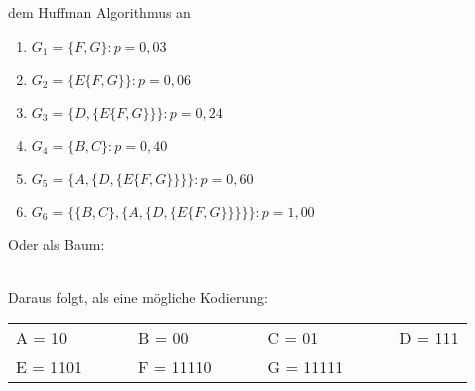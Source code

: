 \begin{questions}
\begin{parts}
\begin{subparts}
			\pagebreak
			\subpart dem Huffman Algorithmus an
			\begin{solutionordottedlines}[2cm]
				\begin{enumerate}
					\item $G_1 = \{F, G\}: p = 0{,}03$
					\item $G_2 = \{E\{F, G\}\}: p = 0{,}06$
					\item $G_3 = \{D,\{E\{F, G\}\}\}: p = 0{,}24$
					\item $G_4 = \{B, C\}: p = 0{,}40$
					\item $G_5 = \{A,\{D,\{E\{F, G\}\}\}\}: p = 0{,}60$
					\item $G_6 = \{\{B, C\}, \{A,\{D,\{E\{F, G\}\}\}\}\}: p = 1{,}00$
				\end{enumerate}
			Oder als Baum:\\
			\\
			Daraus folgt, als eine mögliche Kodierung:\\
				\begin{tabular}{lclclcl}
					A = 10 & ~~~ & B = 00 & ~~~ & C = 01 & ~~~ & D = 111 \\
					E = 1101 & ~~~ & F = 11110 & ~~~ & G = 11111 & & \\
				\end{tabular}
			\end{solutionordottedlines}

		\end{subparts}

	\end{parts}

	\pagebreak
	\thequestiontitle

	\begin{parts}

\end{parts}
\end{questions}
